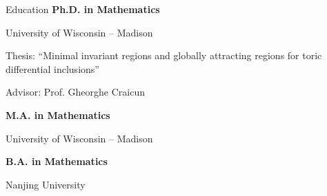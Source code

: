 \begin{rubric}{Education}
\entry*[2016 -- 2020]%
	\textbf{Ph.D. in Mathematics} \par
	University of Wisconsin -- Madison \par
	Thesis: ``Minimal invariant regions and globally attracting regions for toric differential inclusions'' \par
	Advisor: Prof. Gheorghe Craicun

\entry*[2015 -- 2016]%
	\textbf{M.A. in Mathematics} \par
	University of Wisconsin -- Madison

\entry*[2011 -- 2015]%
	\textbf{B.A. in Mathematics} \par
	Nanjing University
\end{rubric}
